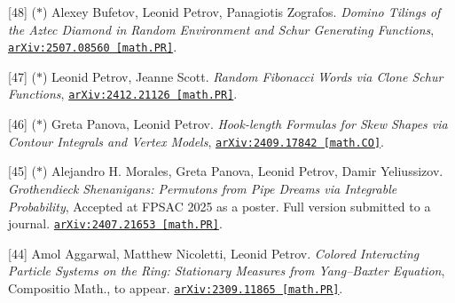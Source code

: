 \begin{etaremune}
\renewcommand{\labelenumi}{[\theenumi]}




\item[{[48]}] ($*$)
Alexey Bufetov, Leonid Petrov, Panagiotis Zografos.
\emph{Domino Tilings of the Aztec Diamond in Random Environment and Schur Generating Functions}, 
\href{https://arxiv.org/abs/2507.08560}{\texttt{arXiv:2507.08560 [math.PR]}}.















\item[{[47]}] ($*$)
Leonid Petrov, Jeanne Scott.
\emph{Random Fibonacci Words via Clone Schur Functions}, 
\href{https://arxiv.org/abs/2412.21126}{\texttt{arXiv:2412.21126 [math.PR]}}.









\item[{[46]}] ($*$)
Greta Panova, Leonid Petrov.
\emph{Hook-length Formulas for Skew Shapes via Contour Integrals and Vertex Models}, 
\href{https://arxiv.org/abs/2409.17842}{\texttt{arXiv:2409.17842 [math.CO]}}.







\item[{[45]}] ($*$)
Alejandro H. Morales, Greta Panova, Leonid Petrov, Damir Yeliussizov.
\emph{Grothendieck Shenanigans: Permutons from Pipe Dreams via Integrable Probability}, Accepted at FPSAC 2025 as a poster. Full version submitted to a journal. 
\href{https://arxiv.org/abs/2407.21653}{\texttt{arXiv:2407.21653 [math.PR]}}.











\item[{[44]}] 
Amol Aggarwal, Matthew Nicoletti, Leonid Petrov.
\emph{Colored Interacting Particle Systems on the Ring: Stationary Measures from Yang--Baxter Equation}, Compositio Math., to appear. 
\href{https://arxiv.org/abs/2309.11865}{\texttt{arXiv:2309.11865 [math.PR]}}.










\end{etaremune}
